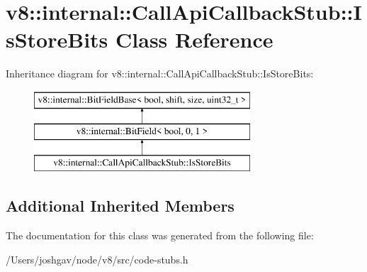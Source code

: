 \hypertarget{classv8_1_1internal_1_1_call_api_callback_stub_1_1_is_store_bits}{}\section{v8\+:\+:internal\+:\+:Call\+Api\+Callback\+Stub\+:\+:Is\+Store\+Bits Class Reference}
\label{classv8_1_1internal_1_1_call_api_callback_stub_1_1_is_store_bits}
Inheritance diagram for v8\+:\+:internal\+:\+:Call\+Api\+Callback\+Stub\+:\+:Is\+Store\+Bits\+:\begin{figure}[H]
\begin{center}
\leavevmode
\includegraphics[height=3.000000cm]{classv8_1_1internal_1_1_call_api_callback_stub_1_1_is_store_bits}
\end{center}
\end{figure}
\subsection*{Additional Inherited Members}


The documentation for this class was generated from the following file\+:\begin{DoxyCompactItemize}
\item 
/\+Users/joshgav/node/v8/src/code-\/stubs.\+h\end{DoxyCompactItemize}
